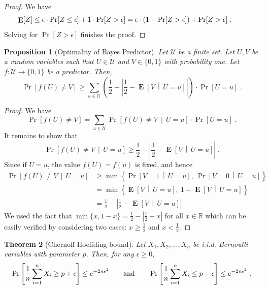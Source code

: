 \documentclass[10pt]{article}
\newtheorem{proposition}{Proposition}
\newtheorem{theorem}[proposition]{Theorem}
\newcommand{\R}{\mathbb{R}}
\newcommand{\U}{\mathcal{U}}
\DeclareMathOperator{\Exp}{\mathbf{E}}
\begin{document}
\begin{proof}
We have
$$
\Exp[Z]
\le \epsilon \cdot \Pr[Z \le \epsilon] + 1 \cdot \Pr[Z > \epsilon]
= \epsilon \cdot (1 - \Pr[Z > \epsilon]) + \Pr[Z > \epsilon] \; .  \qquad \qedhere
$$
Solving for $\Pr[Z > \epsilon]$ finishes the proof.
\end{proof}

\begin{proposition}[Optimality of Bayes Predictor]
\label{proposition:bayes}
Let $\U$ be a finite set. Let $U,V$ be a random variables such that $U \in \U$ and $V \in \{0,1\}$ with probability one.
Let $f:\U \to \{0,1\}$ be a predictor. Then,
$$
\Pr\left[ f(U) \neq V \right]
\ge \sum_{u \in \U} \left( \frac{1}{2} - \left| \frac{1}{2} -  \Exp \left[V \, \middle| \, U = u\right] \right| \right) \cdot \Pr[U = u] \; .
$$
\end{proposition}

\begin{proof}
We have
$$
\Pr \left[ f(U) \neq V \right] = \sum_{u \in \U} \Pr \left[ f(U) \neq V \, \middle| \, U = u \right] \cdot \Pr[U = u] \; .
$$
It remains to show that
$$
\Pr\left[ f(U) \neq V \, \middle| \, U = u \right]
\ge
\frac{1}{2} - \left| \frac{1}{2} -  \Exp \left[V \, \middle| \, U = u \right] \right| \; .
$$
Since if  $U=u$, the value $f(U) = f(u)$ is fixed, and hence
\begin{align*}
\Pr\left[ f(U) \neq V \, \middle| \, U = u \right]
& \ge \min\left\{ \Pr \left[ V = 1 \, \middle| \, U = u \right], \ \Pr \left[ V = 0 \, \middle| \, U = u \right] \right\} \\
& = \min\left\{ \Exp \left[ V  \, \middle| \, U = u \right], \ 1 - \Exp \left[ V \, \middle| \, U = u \right] \right\} \\
& = \frac{1}{2} - \left| \frac{1}{2} -  \Exp \left[ V  \, \middle| \, U = u \right] \right|
\end{align*}
We used the fact that $\min\{x, 1 - x\} = \frac{1}{2} - \left| \frac{1}{2} - x \right|$ for all $x \in \R$
which can be easily verified by considering two cases: $x \ge \frac{1}{2}$ and $x < \frac{1}{2}$.
\end{proof}

\begin{theorem}[Chernoff-Hoeffding bound]
Let $X_1, X_2, \dots, X_n$ be i.i.d. Bernoulli variables with parameter $p$.
Then, for any $\epsilon \ge 0$,
$$
\Pr \left[{\frac {1}{n}} \sum_{i=1}^n X_i \ge p + \epsilon \right] \le e^{ - 2n \epsilon^2}  \qquad \text{and} \qquad
\Pr \left[{\frac {1}{n}} \sum_{i=1}^n X_i \le p - \epsilon \right] \le e^{ - 2n \epsilon^2}  \; . \\
$$
\end{theorem}
\end{document}
